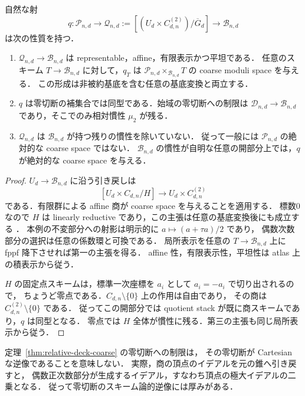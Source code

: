 \begin{theorem}
\label{thm:relative-deck-coarse}
自然な射
\[
 q:\mathcal P_{n,d}\longrightarrow
 \mathcal Q_{n,d}:=[(U_d\times C_{d,n}^{(2)})/\overline G_d]
 \longrightarrow\mathcal B_{n,d}
\]
は次の性質を持つ．
\begin{enumerate}
\item $\mathcal Q_{n,d}\to\mathcal B_{n,d}$ は representable，affine，有限表示かつ平坦である．
任意のスキーム $T\to\mathcal B_{n,d}$ に対して，$q_T$ は
$\mathcal P_{n,d}\times_{\mathcal B_{n,d}}T$ の coarse moduli space を与える．
この形成は非被約基底を含む任意の基底変換と両立する．
\item $q$ は零切断の補集合では同型である．始域の零切断への制限は
$\mathcal D_{n,d}\to\mathcal B_{n,d}$ であり，そこでのみ相対慣性 $\mu_2$ が残る．
\item $\mathcal Q_{n,d}$ は $\mathcal B_{n,d}$ が持つ残りの慣性を除いていない．
従って一般には $\mathcal P_{n,d}$ の絶対的な coarse space ではない．
$\mathcal B_{n,d}$ の慣性が自明な任意の開部分上では，$q$ が絶対的な coarse space を与える．
\end{enumerate}
\end{theorem}
\begin{proof}
$U_d\to\mathcal B_{n,d}$ に沿う引き戻しは
\[
 [U_d\times C_{d,n}/H]\longrightarrow U_d\times C_{d,n}^{(2)}
\]
である．有限群による affine 商が coarse space を与えることを適用する．
標数0なので $H$ は linearly reductive であり，この主張は任意の基底変換後にも成立する
\cite[Theorem~3.2, Corollary~3.3]{AbramovichOlssonVistoli2008}．
本例の不変部分への射影は明示的に $a\mapsto(a+\tau a)/2$ であり，
偶数次数部分の選択は任意の係数環と可換である．
局所表示を任意の $T\to\mathcal B_{n,d}$ 上に fppf 降下させれば第一の主張を得る．
affine 性，有限表示性，平坦性は atlas 上の積表示から従う．

$H$ の固定点スキームは，標準一次座標を $a_i$ として $a_i=-a_i$ で切り出されるので，
ちょうど零点である．$C_{d,n}\setminus\{0\}$ 上の作用は自由であり，
その商は $C_{d,n}^{(2)}\setminus\{0\}$ である．
従ってこの開部分では quotient stack が既に商スキームであり，$q$ は同型となる．
零点では $H$ 全体が慣性に残る．第三の主張も同じ局所表示から従う．
\end{proof}

\begin{remark}[零切断への制限とその逆像]
定理~\ref{thm:relative-deck-coarse} の零切断への制限は，
その零切断が Cartesian な逆像であることを意味しない．
実際，商の頂点のイデアルを元の錐へ引き戻すと，
偶数正次数部分が生成するイデアル，すなわち頂点の極大イデアルの二乗となる．
従って零切断のスキーム論的逆像には厚みがある．
\end{remark}

